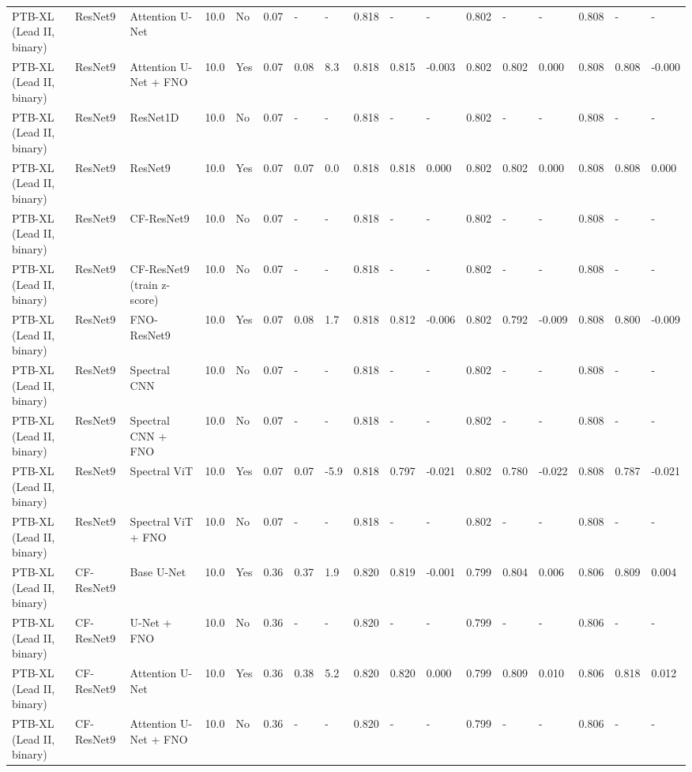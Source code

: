 \begin{longtable}{lllllllllllllllll}
PTB-XL (Lead II, binary) & ResNet9 & Attention U-Net & 10.0 & No & 0.07 & - & - & 0.818 & - & - & 0.802 & - & - & 0.808 & - & - \\
PTB-XL (Lead II, binary) & ResNet9 & Attention U-Net + FNO & 10.0 & Yes & 0.07 & 0.08 & 8.3 & 0.818 & 0.815 & -0.003 & 0.802 & 0.802 & 0.000 & 0.808 & 0.808 & -0.000 \\
PTB-XL (Lead II, binary) & ResNet9 & ResNet1D & 10.0 & No & 0.07 & - & - & 0.818 & - & - & 0.802 & - & - & 0.808 & - & - \\
PTB-XL (Lead II, binary) & ResNet9 & ResNet9 & 10.0 & Yes & 0.07 & 0.07 & 0.0 & 0.818 & 0.818 & 0.000 & 0.802 & 0.802 & 0.000 & 0.808 & 0.808 & 0.000 \\
PTB-XL (Lead II, binary) & ResNet9 & CF-ResNet9 & 10.0 & No & 0.07 & - & - & 0.818 & - & - & 0.802 & - & - & 0.808 & - & - \\
PTB-XL (Lead II, binary) & ResNet9 & CF-ResNet9 (train z-score) & 10.0 & No & 0.07 & - & - & 0.818 & - & - & 0.802 & - & - & 0.808 & - & - \\
PTB-XL (Lead II, binary) & ResNet9 & FNO-ResNet9 & 10.0 & Yes & 0.07 & 0.08 & 1.7 & 0.818 & 0.812 & -0.006 & 0.802 & 0.792 & -0.009 & 0.808 & 0.800 & -0.009 \\
PTB-XL (Lead II, binary) & ResNet9 & Spectral CNN & 10.0 & No & 0.07 & - & - & 0.818 & - & - & 0.802 & - & - & 0.808 & - & - \\
PTB-XL (Lead II, binary) & ResNet9 & Spectral CNN + FNO & 10.0 & No & 0.07 & - & - & 0.818 & - & - & 0.802 & - & - & 0.808 & - & - \\
PTB-XL (Lead II, binary) & ResNet9 & Spectral ViT & 10.0 & Yes & 0.07 & 0.07 & -5.9 & 0.818 & 0.797 & -0.021 & 0.802 & 0.780 & -0.022 & 0.808 & 0.787 & -0.021 \\
PTB-XL (Lead II, binary) & ResNet9 & Spectral ViT + FNO & 10.0 & No & 0.07 & - & - & 0.818 & - & - & 0.802 & - & - & 0.808 & - & - \\
PTB-XL (Lead II, binary) & CF-ResNet9 & Base U-Net & 10.0 & Yes & 0.36 & 0.37 & 1.9 & 0.820 & 0.819 & -0.001 & 0.799 & 0.804 & 0.006 & 0.806 & 0.809 & 0.004 \\
PTB-XL (Lead II, binary) & CF-ResNet9 & U-Net + FNO & 10.0 & No & 0.36 & - & - & 0.820 & - & - & 0.799 & - & - & 0.806 & - & - \\
PTB-XL (Lead II, binary) & CF-ResNet9 & Attention U-Net & 10.0 & Yes & 0.36 & 0.38 & 5.2 & 0.820 & 0.820 & 0.000 & 0.799 & 0.809 & 0.010 & 0.806 & 0.818 & 0.012 \\
PTB-XL (Lead II, binary) & CF-ResNet9 & Attention U-Net + FNO & 10.0 & No & 0.36 & - & - & 0.820 & - & - & 0.799 & - & - & 0.806 & - & - \\

\end{longtable}
